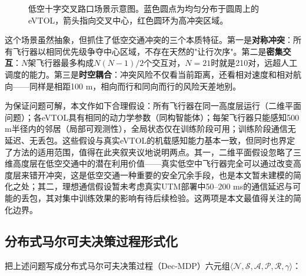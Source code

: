 \documentclass[12pt,a4paper,UTF8]{ctexart}
\begin{document}
\begin{figure}[H]
    \centering
    \begin{minipage}[c]{0.7\textwidth}
    \centering
    \end{minipage}
    \caption{低空十字交叉路口场景示意图。蓝色圆点为均匀分布于圆周上的eVTOL，箭头指向交叉中心，红色圆环为高冲突区域。}
    \label{fig:scenario}
\end{figure}

这个场景虽然抽象，但抓住了低空交通冲突的三个本质特征。第一是\textbf{对称冲突}：所有飞行器以相同优先级争夺中心区域，不存在天然的"让行次序"。第二是\textbf{密集交互}：$N$架飞行器最多构成$N(N-1)/2$个交互对，$N=21$时就是210对，远超人工调度的能力。第三是\textbf{时空耦合}：冲突风险不仅看当前距离，还看相对速度和相对航向——同样是相距100 m，相向而行和同向而行的风险天差地别。

为保证问题可解，本文作如下合理假设：所有飞行器在同一高度层运行（二维平面问题）；各eVTOL具有相同的动力学参数（同构智能体）；每架飞行器只能感知500 m半径内的邻居（局部可观测性），全局状态仅在训练阶段可用；训练阶段通信无延迟、无丢包。这些假设与真实eVTOL的机载感知能力基本一致，但同时也界定了方法的适用范围，值得在此夹叙夹议地说明两点。其一，二维平面假设忽略了三维高度层在低空交通中的潜在利用价值——真实低空中飞行器完全可以通过改变高度层来错开冲突，这是低空交通一种重要的安全冗余手段，也是本文暂未建模的简化之处；其二，理想通信假设暂未考虑真实UTM部署中50--200 ms的通信延迟与可能的丢包，其对集中训练效果的影响有待后续检验。这两项是本文最值得关注的简化边界。

\subsection{分布式马尔可夫决策过程形式化}

把上述问题写成分布式马尔可夫决策过程（Dec-MDP）\cite{ref41}六元组$\langle \mathcal{N}, \mathcal{S}, \mathcal{A}, \mathcal{P}, \mathcal{R}, \gamma \rangle$：
\end{document}
